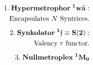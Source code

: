 \documentclass[preview]{standalone}
\begin{document}
\begin{align*}
\special{dvisvgm:raw <g id='unique000'>}1.\;\mathbf{Hypermetrophor\;{}^1\mathbf{w}\widetilde{\mathbf{a}}:}\\\;\;\text{Encapsulates }N\text{ Syntrices.}\\[4pt]2.\;\mathbf{Synkolator\;{}^1\mathfrak{f}\equiv S(2):}\\\;\;\text{Valency }r\text{ functor.}\\[4pt]3.\;\mathbf{Nullmetroplex\;{}^1\mathbf{M}_0}\special{dvisvgm:raw </g>}
\end{align*}
\end{document}
